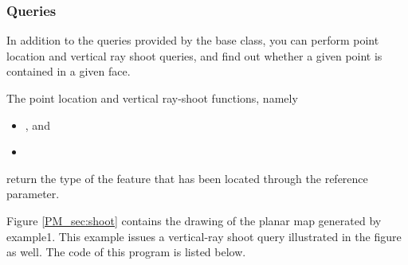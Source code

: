 
\subsubsection{Queries}

In addition to the queries provided by the 
base class, you can perform point location and vertical ray shoot
queries, and find out whether a given point is contained in a given
face.

The point location and vertical ray-shoot functions, namely
\begin{itemize}
\item
{},
and
\item
{}
\end{itemize}
return the type of the feature that has been located through the
 reference parameter.

Figure \ref{PM_sec:shoot} contains
the drawing of the planar map generated by example1. This example issues 
a vertical-ray shoot query illustrated in the figure as well. The code of this
program is listed below.

